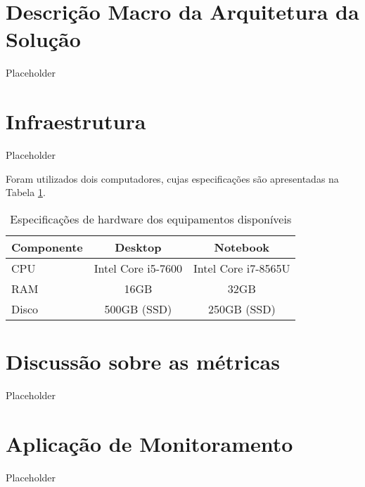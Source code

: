 {    %

}

\section{Descrição Macro da Arquitetura da Solução}

Placeholder

\section{Infraestrutura}

Placeholder


Foram utilizados dois computadores, cujas especificações são apresentadas na Tabela \ref{tab:available-hardware}.

\begin{table}[H]
\centering
\caption{Especificações de hardware dos equipamentos disponíveis}
\label{tab:available-hardware}
\begin{tabular}{lcc}
\toprule
\textbf{Componente} & \textbf{Desktop} & \textbf{Notebook} \\
\midrule
CPU   & Intel Core i5-7600   & Intel Core i7-8565U \\
RAM   & 16GB                 & 32GB                \\
Disco & 500GB (SSD)            & 250GB (SSD)          \\
\bottomrule
\end{tabular}
\end{table}



\section{Discussão sobre as métricas}

Placeholder

\section{Aplicação de Monitoramento}

Placeholder
